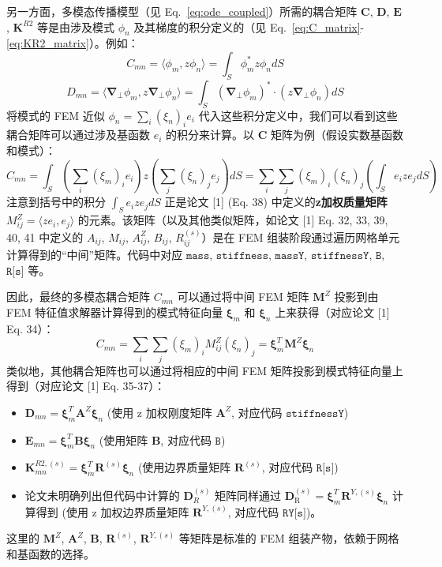 \documentclass{ctexart}
\begin{document}
另一方面，多模态传播模型（见 Eq.~\eqref{eq:ode_coupled}）所需的耦合矩阵 $\mathbf{C}$, $\mathbf{D}$, $\mathbf{E}$, $\mathbf{K}^{R2}$ 等是由涉及模式 $\phi_n$ 及其梯度的积分定义的（见 Eq.~\eqref{eq:C_matrix}-\eqref{eq:KR2_matrix}）。例如：
\[
C_{mn} = \langle \phi_m, z \phi_n \rangle = \int_S \phi_m^* z \phi_n dS
\]
\[
D_{mn} = \langle \boldsymbol{\nabla}_\perp \phi_m, z \boldsymbol{\nabla}_\perp \phi_n \rangle = \int_S (\boldsymbol{\nabla}_\perp \phi_m)^* \cdot (z \boldsymbol{\nabla}_\perp \phi_n) dS
\]
将模式的 FEM 近似 $\phi_n = \sum_i (\xi_n)_i e_i$ 代入这些积分定义中，我们可以看到这些耦合矩阵可以通过涉及基函数 $e_i$ 的积分来计算。以 $\mathbf{C}$ 矩阵为例（假设实数基函数和模式）：
\[
C_{mn} = \int_S \left( \sum_i (\xi_m)_i e_i \right) z \left( \sum_j (\xi_n)_j e_j \right) dS = \sum_i \sum_j (\xi_m)_i (\xi_n)_j \left( \int_S e_i z e_j dS \right)
\]
注意到括号中的积分 $\int_S e_i z e_j dS$ 正是论文 [1] (Eq. 38) 中定义的\textbf{z加权质量矩阵} $M^Z_{ij} = \langle z e_i, e_j \rangle$ 的元素。该矩阵（以及其他类似矩阵，如论文 [1] Eq. 32, 33, 39, 40, 41 中定义的 $A_{ij}$, $M_{ij}$, $A^Z_{ij}$, $B_{ij}$, $R^{(s)}_{ij}$）是在 FEM 组装阶段通过遍历网格单元计算得到的``中间''矩阵。代码中对应 $\texttt{mass}$, $\texttt{stiffness}$, $\texttt{massY}$, $\texttt{stiffnessY}$, $\texttt{B}$, $\texttt{R[s]}$ 等。

因此，最终的多模态耦合矩阵 $C_{mn}$ 可以通过将中间 FEM 矩阵 $\mathbf{M}^Z$ 投影到由 FEM 特征值求解器计算得到的模式特征向量 $\boldsymbol{\xi}_m$ 和 $\boldsymbol{\xi}_n$ 上来获得（对应论文 [1] Eq. 34）：
\[
C_{mn} = \sum_i \sum_j (\xi_m)_i M^Z_{ij} (\xi_n)_j = \boldsymbol{\xi}_m^T \mathbf{M}^Z \boldsymbol{\xi}_n
\]
类似地，其他耦合矩阵也可以通过将相应的中间 FEM 矩阵投影到模式特征向量上得到（对应论文 [1] Eq. 35-37）：
\begin{itemize}
    \item $\mathbf{D}_{mn} = \boldsymbol{\xi}_m^T \mathbf{A}^Z \boldsymbol{\xi}_n$ (使用 z 加权刚度矩阵 $\mathbf{A}^Z$, 对应代码 $\texttt{stiffnessY}$)
    \item $\mathbf{E}_{mn} = \boldsymbol{\xi}_m^T \mathbf{B} \boldsymbol{\xi}_n$ (使用矩阵 $\mathbf{B}$, 对应代码 $\texttt{B}$)
    \item $\mathbf{K}^{R2, (s)}_{mn} = \boldsymbol{\xi}_m^T \mathbf{R}^{(s)} \boldsymbol{\xi}_n$ (使用边界质量矩阵 $\mathbf{R}^{(s)}$, 对应代码 $\texttt{R[s]}$)
    \item 论文未明确列出但代码中计算的 $\mathbf{D}_R^{(s)}$ 矩阵同样通过 $\mathbf{D}^{(s)}_{\mathrm{R}} = \boldsymbol{\xi}_m^T \mathbf{R}^{Y,(s)} \boldsymbol{\xi}_n$ 计算得到 (使用 z 加权边界质量矩阵 $\mathbf{R}^{Y,(s)}$, 对应代码 $\texttt{RY[s]}$)。
\end{itemize}
这里的 $\mathbf{M}^Z$, $\mathbf{A}^Z$, $\mathbf{B}$, $\mathbf{R}^{(s)}$, $\mathbf{R}^{Y,(s)}$ 等矩阵是标准的 FEM 组装产物，依赖于网格和基函数的选择。
\end{document}
